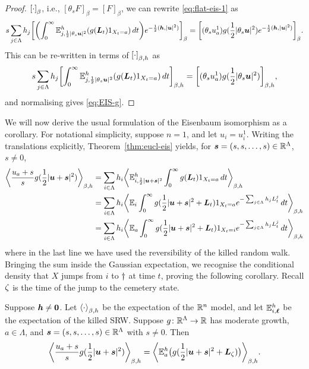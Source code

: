 \documentclass[11pt,a4paper]{article}
\begin{document}
\begin{proof}
  $\cb{\cdot}_{\beta}$, i.e., 
  $[\theta_sF]_\beta = [F]_\beta$, we can rewrite
  \eqref{eq:flat-eis-1} as
  \begin{equation}
    s\sum_{j\in\Lambda}h_j\uspin{ \ob{\int_0^\infty
      \E_{j,\frac{1}{2}|\theta_s\V{u}|^2}^h(g(\V{L}_t)1_{X_{t}=a})\,dt}e^{-\frac{1}{2}(\V{h},|\V{u}|^2)}
    }_{\beta} 
    = 
    \uspin{(\theta_s u_a^1) g(\frac{1}{2}|\theta_s \V{u}|^2) e^{-\frac{1}{2}(\V{h},|\V{u}|^2)}}_{\beta}.
  \end{equation}
  This can be re-written in terms of $\cb{\cdot}_{\beta,h}$ as 
    \begin{equation}
    s\sum_{j\in\Lambda}h_j\uspin{ \int_0^\infty
      \E_{j,\frac{1}{2}|\theta_s\V{u}|^2}^h(g(\V{L}_t)1_{X_{t}=a})\,dt}_{\beta,h} 
    = 
    \uspin{(\theta_s u_a^1) g(\frac{1}{2}|\theta_s \V{u}|^2)}_{\beta,h},
  \end{equation} 
  and normalising gives \eqref{eq:EIS-g}.
\end{proof} 

We will now derive the usual formulation of the Eisenbaum isomorphism
as a corollary. For notational simplicity, suppose $n=1$, and let
$u_{i}=u_{i}^{1}$.  Writing the translations explicitly,
Theorem~\ref{thm:eucl-eis} yields, for
$\boldsymbol{s}=(s,s,\dots, s)\in\mathbb{R}^{\Lambda}$, $s\neq 0$,
\begin{align}
  \spin{\frac{u_{a}+s}{s}g( \frac{1}{2}|\V{u}+\V{s}|^{2})}_{\beta,h} 
  &=
  \sum_{i\in\Lambda}h_{i}\spin{\E^{h}_{i,\frac{1}{2}|\V{u}+\V{s}|^{2}} \int_{0}^{\infty} g(\V{L}_{t}) 
  1_{X_{t}=a}\, dt}_{\beta,h}\nnb
  &=
  \sum_{i\in\Lambda}h_{i}\spin{\E_{i} \int_{0}^{\infty}g(\frac{1}{2}|\V{u}+\V{s}|^{2}+\V{L}_{t}) 
  1_{X_{t}=a}e^{-\sum_{j\in\Lambda}h_{j}L_{t}^{j}}\, dt}_{\beta,h} \nnb
  &=
  \sum_{i\in\Lambda}h_{i}\spin{\E_{a} \int_{0}^{\infty}g(\frac{1}{2}|\V{u}+\V{s}|^{2}+\V{L}_{t}) 
  1_{X_{t}=i}e^{-\sum_{j\in\Lambda}h_{j}L_{t}^{j}}\, dt}_{\beta,h}
\end{align}
where in the last line we have used the reversibility of the killed random
walk. Bringing the sum inside the Gaussian expectation, we recognise
the conditional density that $X$ jumps from $i$ to $\dagger$ at time $t$,
proving the following corollary.
Recall $\zeta$ is the time of the jump to the cemetery state.

\begin{corollary}
  \label{cor:EIS-c}
  Suppose $\boldsymbol{h}\neq \boldsymbol{0}$. Let $\spin{\cdot}_{\beta,h}$ be the
  expectation of the $\mathbb{R}^n$ model, and let $\mathbb{E}_{i,\boldsymbol{\ell}}^h$ be the
  expectation of the killed SRW.  Suppose $g\colon\mathbb{R}^{\Lambda}\to\mathbb{R}$
  has moderate growth, $a\in\Lambda$, and
  $\boldsymbol{s}=(s,s,\dots, s) \in \mathbb{R}^\Lambda$ with $s\neq 0$. Then
  \begin{equation}
    \label{eq:EIS-c}
    \avga{\frac{u_{a}+s}{s}g( \frac{1}{2}|\V{u}+\V{s}|^{2})}_{\beta,h} = \avga{
      \E_{a}^{h} \pb{ g( \frac{1}{2}|\V{u}+\V{s}|^{2} + \V{L}_{\death})}}_{\beta,h}.
  \end{equation}
\end{corollary}
\end{document}
